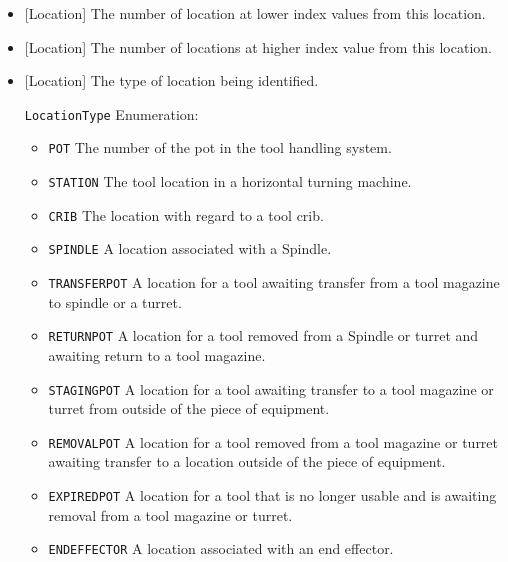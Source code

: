 \begin{itemize}

\item {}[Location] \newline The number of location at lower index values from this location.

\item {}[Location] \newline The number of locations at higher index value from this location.


\item {}[Location] \newline The type of location being identified. 

\texttt{LocationType} Enumeration:

\begin{itemize}
\item \texttt{POT} \newline The number of the pot in the tool handling system. 
\item \texttt{STATION} \newline The tool location in a horizontal turning machine. 
\item \texttt{CRIB} \newline The location with regard to a tool crib. 
\item \texttt{SPINDLE} \newline A location associated with a \gls{Spindle}. 
\item \texttt{TRANSFER\textunderscore POT} \newline A location for a tool awaiting transfer from a tool magazine to spindle or a turret. 
\item \texttt{RETURN\textunderscore POT} \newline A location for a tool removed from a \gls{Spindle} or turret and awaiting return to a tool magazine.
 
\item \texttt{STAGING\textunderscore POT} \newline A location for a tool awaiting transfer to a tool magazine or turret from outside of the piece of equipment. 
\item \texttt{REMOVAL\textunderscore POT} \newline A location for a tool removed from a tool magazine or turret awaiting transfer to a location outside of the piece of equipment.
 
\item \texttt{EXPIRED\textunderscore POT} \newline A location for a tool that is no longer usable and is awaiting removal from a tool magazine or turret. 
\item \texttt{END\textunderscore EFFECTOR} \newline A location associated with an end effector. 
\end{itemize}



\end{itemize}

